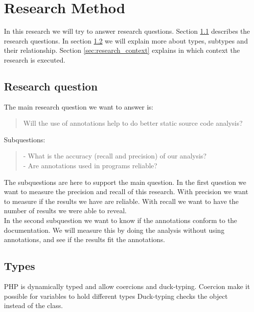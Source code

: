 \documentclass[../main.tex]{subfiles}
\begin{document}
    \chapter{Research Method}\label{chap:research_method}

    In this research we will try to answer research questions.
    Section \ref{sec:research_question} describes the research questions.
    In section \ref{sec:types} we will explain more about types, subtypes and their relationship.
    Section \ref{sec:research_context} explains in which context the research is executed.

    \section{Research question}\label{sec:research_question}
    The main research question we want to answer is:
    \\
    \begin{quote}
        Will the use of annotations\footnotemark{} help to do better static source code analysis?
    \end{quote}
    Subquestions:
    \begin{quote}
        - What is the accuracy (recall and precision) of our analysis?
        \\
        - Are annotations used in programs reliable?
    \end{quote}
    The subquestions are here to support the main question. 
    In the first question we want to measure the precision and recall of this research.
    With precision we want to measure if the results we have are reliable.
    With recall we want to have the number of results we were able to reveal.
    \\
    In the second subquestion we want to know if the annotations conform to the documentation.
    We will measure this by doing the analysis without using annotations, and see if the results fit the annotations.    
    
   \section{Types}\label{sec:types}
    PHP is dynamically typed and allow coercions and duck-typing.
    Coercion make it possible for variables to hold different types
    Duck-typing checks the object instead of the class.
    
\end{document}
